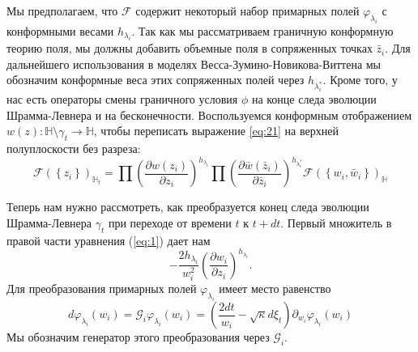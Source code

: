 
Мы предполагаем, что $\mathcal{F}$ содержит некоторый набор примарных полей  $\varphi_{\lambda_{i}}$ с конформными весами $h_{\lambda_{i}}$. Так как мы рассматриваем граничную конформную теорию поля, мы должны добавить объемные поля в сопряженных точках  $\bar z_{i}$. Для дальнейшего использования в моделях Весса-Зумино-Новикова-Виттена мы обозначим конформные веса этих сопряженных полей через $h_{\lambda_{i}^{*}}$. Кроме того, у нас есть операторы смены граничного условия   $\phi$ на конце следа эволюции Шрамма-Левнера и на бесконечности. Воспользуемся конформным отображением   $w(z):\mathbb{H}\setminus\gamma_{t}\to \mathbb{H}$, чтобы переписать выражение \eqref{eq:21} на верхней полуплоскости без разреза:
\begin{equation}
  \mathcal{F}(\left\{z_{i}\right\})_{\mathbb{H}_{t}}=\prod \left(\frac{\partial w(z_{i})}{\partial z_{i}}\right)^{h_{\lambda_i}} 
  \prod \left(\frac{\partial \bar w(\bar z_{i})}{\partial \bar z_{i}}\right)^{h_{\lambda^{*}_i}}
  \mathcal{F}(\left\{w_{i}, \bar w_{i}\right\})_{\mathbb{H}}
  \label{eq:1}
\end{equation}

Теперь нам нужно рассмотреть, как преобразуется конец следа эволюции Шрамма-Левнера  $\gamma_{t}$ при переходе от времени $t$ к $t+ dt$. Первый множитель в правой части уравнения  (\ref{eq:1}) дает нам
\begin{equation*}
  -\frac{2h_{\lambda_{i}}}{w_{i}^{2}}\left(\frac{\partial w_{i}}{\partial z_{i}}\right)^{h_{\lambda_{i}}}.
\end{equation*}
Для преобразования примарных полей  $\varphi_{\lambda_{i}}$ имеет место равенство
\begin{equation}
  \label{eq:2}
  d\varphi_{\lambda_{i}}(w_{i}) = \mathcal{G}_{i}\varphi_{\lambda_{i}}(w_{i})=\left(\frac{2dt}{w_{i}}-\sqrt{\kappa} d\xi_{t}\right) \partial_{w_{i}}\varphi_{\lambda_{i}}(w_{i}) 
\end{equation}
Мы обозначим генератор этого преобразования через  $\mathcal{G}_{i}$.

